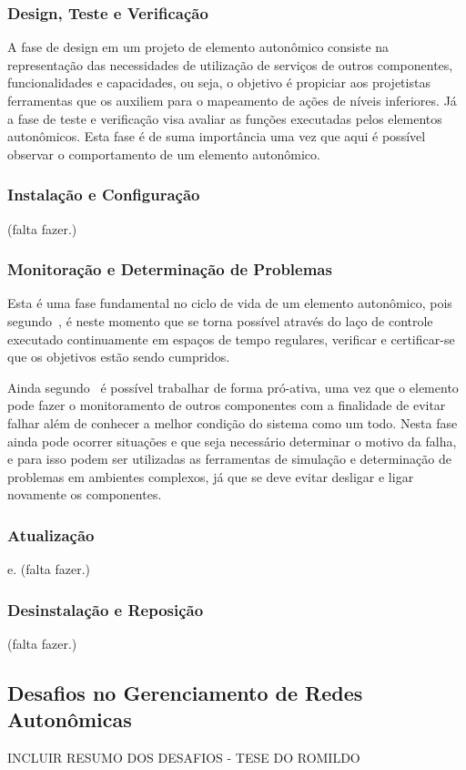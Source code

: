 \documentclass[11pt,twoside]{article}
\begin{document}
\subsubsection{Design, Teste e Verificação}
A fase de design em um projeto de elemento autonômico consiste na representação das necessidades de utilização de serviços de outros componentes, funcionalidades e capacidades, ou seja, o objetivo é propiciar aos projetistas ferramentas que os auxiliem para o mapeamento de ações de níveis inferiores. Já a fase de teste e verificação visa avaliar as funções executadas pelos elementos autonômicos. Esta fase é de suma importância uma vez que aqui é possível observar o comportamento de um elemento autonômico.

\subsubsection{Instalação e Configuração}
(falta fazer.)

\subsubsection{Monitoração e Determinação de Problemas}
Esta é uma fase fundamental no ciclo de vida de um elemento autonômico, pois segundo~\cite{KEPHART}, é neste momento que se torna possível através do laço de controle executado continuamente em espaços de tempo regulares, verificar e certificar-se que os objetivos estão sendo cumpridos. 

Ainda segundo~\cite{KEPHART} é possível trabalhar de forma pró-ativa, uma vez que o elemento pode fazer o monitoramento de outros componentes com a finalidade de evitar falhar além de conhecer a melhor condição do sistema como um todo. Nesta fase ainda pode ocorrer situações e que seja necessário determinar o motivo da falha, e para isso podem ser utilizadas as ferramentas de simulação e determinação de problemas em ambientes complexos, já que se deve evitar desligar e ligar novamente os componentes.
\subsubsection{Atualização}
e.	(falta fazer.)

\subsubsection{Desinstalação e Reposição}
(falta fazer.)

\subsection{Desafios no Gerenciamento de Redes Autonômicas}
INCLUIR RESUMO DOS DESAFIOS - TESE DO ROMILDO
\end{document}
